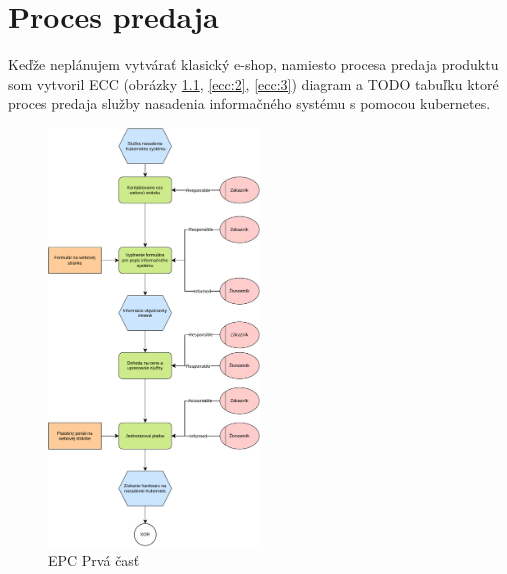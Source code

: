 \chapter{Proces predaja}

Keďže neplánujem vytvárať klasický e-shop, namiesto procesa predaja produktu som vytvoril ECC (obrázky \ref{ecc:1}, \ref{ecc:2}, \ref{ecc:3}) diagram a TODO tabuľku ktoré proces predaja služby nasadenia informačného systému s pomocou kubernetes.

\begin{figure}[htbp]
  \centering
  \includegraphics[width=0.5\textwidth]{images/EPC_1.pdf}
  \caption{EPC Prvá časť}
  \label{ecc:1}
\end{figure}


